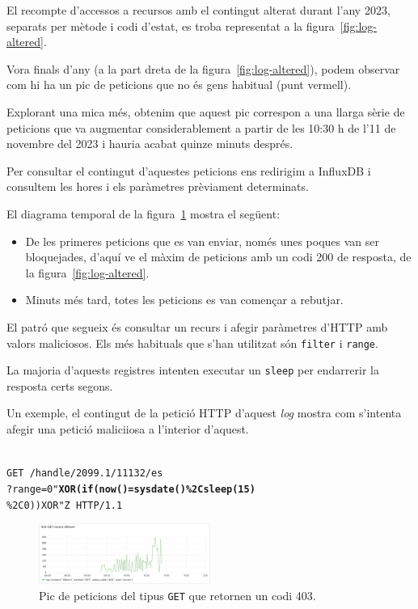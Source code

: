 \documentclass[lettersize,journal]{IEEEtran}
\begin{document}
El recompte d'accessos a recursos amb el contingut alterat durant l'any 2023, separats per mètode i codi d'estat, es troba representat a la figura~\ref{fig:log-altered}.

Vora finals d'any (a la part dreta de la figura~\ref{fig:log-altered}), podem observar com hi ha un pic de peticions que no és gens habitual (punt vermell).

Explorant una mica més, obtenim que aquest pic correspon a una llarga sèrie de peticions que va augmentar considerablement a partir de les 10:30 h de l'11 de novembre del 2023 i hauria acabat quinze minuts després.

Per consultar el contingut d'aquestes peticions ens redirigim a InfluxDB i consultem les hores i els paràmetres prèviament determinats.

El diagrama temporal de la figura~\ref{fig:possible-attacks} mostra el següent:

\begin{itemize}
    \item De les primeres peticions que es van enviar, només unes poques van ser bloquejades, d'aquí ve el màxim de peticions amb un codi 200 de resposta, de la figura~\ref{fig:log-altered}.
    \item Minuts més tard, totes les peticions es van començar a rebutjar.
\end{itemize}
El patró que segueix és consultar un recurs i afegir paràmetres d'HTTP amb valors maliciosos.
Els més habituals que s'han utilitzat són \texttt{filter} i \texttt{range}.

La majoria d'aquests registres intenten executar un \texttt{sleep} per endarrerir la resposta certs segons.

Un exemple, el contingut de la petició HTTP d'aquest \textit{log} mostra com s'intenta afegir una petició maliciiosa a l'interior d'aquest.

\noindent \\
\texttt{GET /handle/2099.1/11132/es\\?range=0"\textbf{XOR(if(now()=sysdate()\%2Csleep(15)}\\\%2C0))XOR"Z HTTP/1.1}

\begin{figure}[!t]
    \centerline{\includegraphics[width=0.5\textwidth]{figures/possible-attacks-403}}
    \caption{Pic de peticions del tipus \texttt{GET} que retornen un codi 403.}\label{fig:possible-attacks}
\end{figure}
\end{document}
